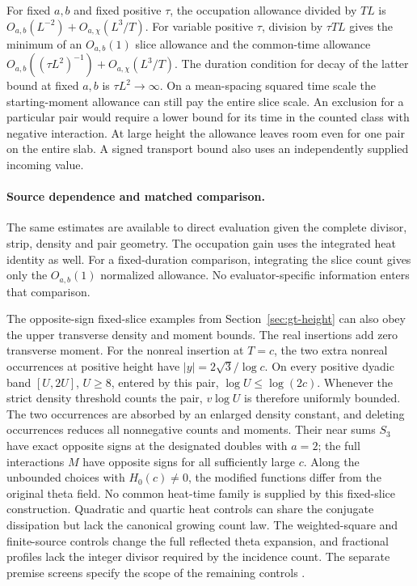 For fixed \(a,b\) and fixed positive \(\tau\), the occupation
allowance divided by \(TL\) is
\(O_{a,b}(L^{-2})+O_{a,\chi}(L^3/T)\).
For variable positive \(\tau\), division by \(\tau TL\) gives
the minimum of an \(O_{a,b}(1)\) slice allowance and the
common-time allowance
\(O_{a,b}((\tau L^2)^{-1})+O_{a,\chi}(L^3/T)\).
The duration condition for decay of the latter bound at fixed
\(a,b\) is \(\tau L^2\to\infty\). On a mean-spacing squared
time scale the starting-moment allowance can still pay the entire
slice scale. An exclusion for a particular pair would require a
lower bound for its time in the counted class with negative
interaction. At large height the allowance leaves room even for
one pair on the entire slab. A signed transport bound also uses an
independently supplied incoming value.

\paragraph{Source dependence and matched comparison.}
The same estimates are available to direct evaluation given the
complete divisor, strip, density and pair geometry. The occupation
gain uses the integrated heat identity as well. For a fixed-duration
comparison, integrating the slice count gives only the
\(O_{a,b}(1)\) normalized allowance. No evaluator-specific
information enters that comparison.

The opposite-sign fixed-slice examples from Section~\ref{sec:gt-height}
can also obey the upper transverse density and moment bounds.
The real insertions add zero transverse moment. For the nonreal
insertion at \(T=c\), the two extra nonreal occurrences at positive
height have \(|y|=2\sqrt3/\log c\). On every positive dyadic band
\([U,2U]\), \(U\ge8\), entered by this pair, \(\log U\le\log(2c)\).
Whenever the strict density threshold counts the pair,
\(v\log U\) is therefore uniformly bounded. The two occurrences
are absorbed by an enlarged density constant, and deleting
occurrences reduces all nonnegative counts and moments. Their
near sums \(S_3\) have exact opposite signs at the designated
doubles with \(a=2\); the full interactions \(M\) have opposite
signs for all sufficiently large \(c\). Along the unbounded choices
with \(H_0(c)\ne0\), the modified functions differ from the original
theta field. No common heat-time family is supplied by this
fixed-slice construction.
Quadratic and quartic heat controls can share the conjugate
dissipation but lack the canonical growing count law. The
weighted-square and finite-source controls change the full
reflected theta expansion, and fractional profiles lack the
integer divisor required by the incidence count. The separate
premise screens specify the scope of the remaining controls
\cite{gtcounts,gttransverse}.

